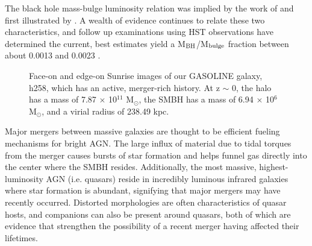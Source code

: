 \documentclass[12pt,headA,chapB]{fiskthesis}
\begin{document}
The black hole mass-bulge luminosity relation was implied by the work of \cite{Dressler1988} and first illustrated by \cite{Kormendy1993}. A wealth of evidence continues to relate these two characteristics, and follow up examinations using HST observations have determined the current, best estimates yield a M$_{\rm BH}$/M$_{\rm bulge}$ fraction between about 0.0013 and 0.0023 \citep{Merritt2001a,McLure2001,Marconi2003}. 

\begin{figure}[h]
\centerline{}
\caption[GASOLINE h258]{Face-on and edge-on Sunrise images of our GASOLINE galaxy, h258, which has an active, merger-rich history. At z $\sim$ 0, the halo has a mass of 7.87 $\times$ 10$^{11}$ M$_{\odot}$, the SMBH has a mass of 6.94 $\times$ 10$^6$ M$_{\odot}$, and a virial radius of 238.49 kpc. }
\label{h258face} 
\end{figure}

Major mergers between massive galaxies are thought to be efficient fueling mechanisms for bright AGN. The large influx of material due to tidal torques from the merger causes bursts of star formation and helps funnel gas directly into the center where the SMBH resides. \citep{Richards2006,Reddy2008,Hopkins2010} Additionally, the most massive, highest-luminosity AGN (i.e. quasars) reside in incredibly luminous infrared galaxies where star formation is abundant, signifying that major mergers may have recently occurred. \citep{Treister2012} Distorted morphologies are often characteristics of quasar hosts, and companions can also be present around quasars, both of which are evidence that strengthen the possibility of a recent merger having affected their lifetimes. 
\end{document}
